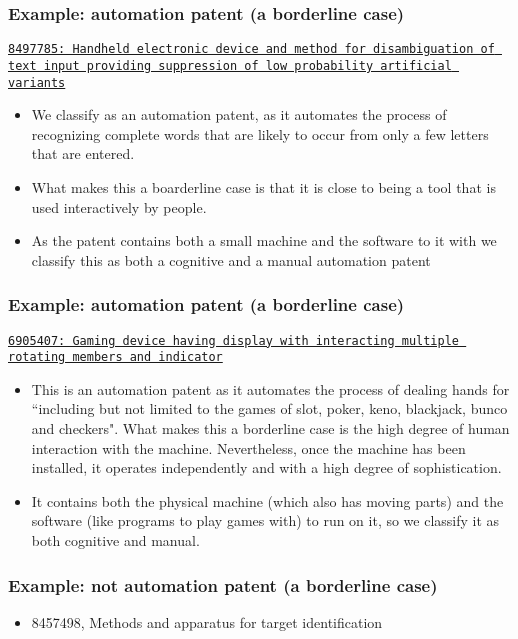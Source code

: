 \documentclass[10pt]{beamer}
\begin{document}
\begin{frame}\frametitle{Example: automation patent (a borderline case)}
\href{https://www.google.de/patents/US8497785?dq=8497785&hl=en&sa=X&ei=2O5RVYD3L4GWsAGt0oCgCA&ved=0CCEQ6AEwAA}{\texttt{8497785: Handheld electronic device and method for disambiguation of text input providing suppression of low probability artificial variants}}
	\begin{itemize}	
	\item We classify as an automation patent, as it automates the process of recognizing complete words that are likely to occur from only a few letters that are entered.
	\item What makes this a boarderline case is that it is close to being a tool that is used interactively by people.
	\item As the patent contains both a small machine and the software to it with we classify this as both a cognitive and a manual automation patent
	\end{itemize}
\end{frame}


\begin{frame}\frametitle{Example: automation patent (a borderline case)}
\href{https://www.google.de/patents/US6905407?dq=6905407&hl=en&sa=X&ei=XfJRVYDIAYmosAGKx4CwCw&ved=0CCEQ6AEwAA}{\texttt{6905407: Gaming device having display with interacting multiple rotating members and indicator}}
	\begin{itemize}	
	\item This is an automation patent as it automates the process of dealing hands for ``including but not limited to the games of slot, poker, keno, blackjack, bunco and checkers". What makes this a borderline case is the high degree of human interaction with the machine. Nevertheless, once the machine has been installed, it operates independently and with a high degree of sophistication.
	\item It contains both the physical machine (which also has moving parts) and the software (like programs to play games with) to run on it, so we classify it as both cognitive and manual.
	\end{itemize}
\end{frame}


\begin{frame}\frametitle{Example: \textbf{not} automation patent (a borderline case)}
	\begin{itemize}	
	\item 8457498, Methods and apparatus for target identification
	\end{itemize}
\end{frame}
\end{document}

